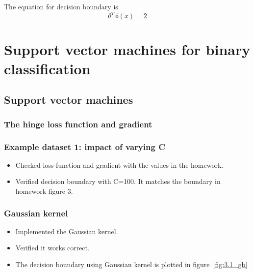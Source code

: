 \documentclass{article}
\begin{document}
\subsection{}
The equation for decision boundary is
\begin{equation*}
	\theta^T \phi(x) = 2
\end{equation*}

\section{Support vector machines for binary classification}

\subsection{Support vector machines}
\subsubsection{The hinge loss function and gradient}
\subsubsection{Example dataset 1: impact of varying C}
\begin{itemize}
	\item Checked loss function and gradient with the values in the homework.
	\item Verified decision boundary with C=100. It matches the boundary in homework figure 3.
\end{itemize}

\subsubsection{Gaussian kernel}
\begin{itemize}
	\item Implemented the Gaussian kernel.
	\item Verified it works correct.
	\item The decision boundary using Gaussian kernel is plotted in figure~\ref{fig:3.1_gb}
\end{itemize}
\end{document}

